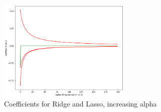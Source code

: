 \documentclass[10pt,twocolumn]{article}
\begin{document}
\begin{figure}[!t]
  \begin{center}
    \includegraphics[width=2.5in]{figure6.png}
  \end{center}

  \caption{\small Coefficients for Ridge and Lasso, increasing alpha}
  \label{fig-6}
\end{figure}
\end{document}
